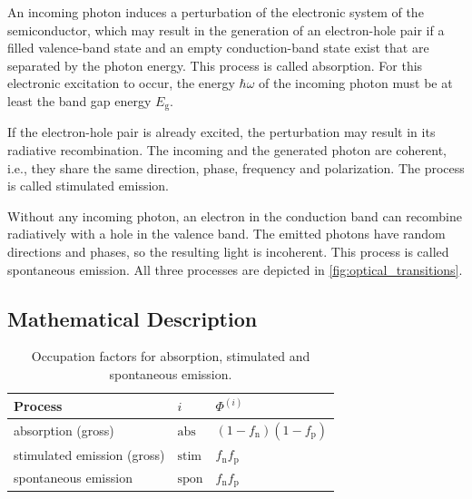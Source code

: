 An incoming photon induces a perturbation of the electronic system of the
semiconductor, which may result in the generation of an electron-hole pair if a filled valence-band state and an empty conduction-band state exist that are
separated by the photon energy. This
process is called absorption. For this electronic excitation to occur, the
energy $\hbar \omega$ of the incoming photon must be at least the band gap
energy $E_{\mathrm{g}}$.

If the electron-hole pair is already excited, the perturbation may result in its
radiative recombination.
The incoming and the generated photon are coherent, i.e., they share the same direction,
phase, frequency and polarization. The process is called stimulated emission.

Without any incoming photon, an electron in the conduction band can recombine radiatively
with a hole in the valence band. The emitted photons have random directions and
phases, so the resulting light is incoherent. This process is called spontaneous
emission. All three processes are depicted in \cref{fig:optical_transitions}.

\subsection{Mathematical Description}
\label{sec:mathematical_description}

\begin{table}
	\centering
	\begin{tabular}{lll}
		\toprule Process            & $i$             & $\Phi^{(i)}$                           \\
		\midrule absorption (gross) & $\mathrm{abs}$  & $(1-f_{\mathrm{n}})(1-f_{\mathrm{p}})$ \\
		stimulated emission (gross) & $\mathrm{stim}$ & $f_{\mathrm{n}}f_{\mathrm{p}}$         \\
		spontaneous emission        & $\mathrm{spon}$ & $f_{\mathrm{n}}f_{\mathrm{p}}$         \\
		\bottomrule
	\end{tabular}
	\caption{Occupation factors for absorption, stimulated and spontaneous emission.}
	\label{tab:occupation_factors}
\end{table}

